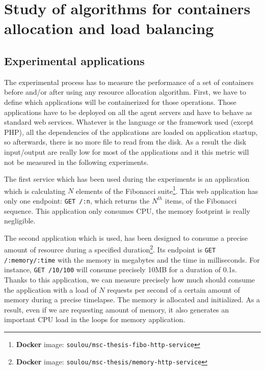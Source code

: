 \chapter{Study of algorithms for containers allocation and load balancing}
\label{chapt:containerloadbalance}

\section{Experimental applications}

The experimental process has to measure the performance of a set of containers
before and/or after using any resource allocation algorithm. First, we have to
define which applications will be containerized for those operations. Those
applications have to be deployed on all the agent servers and have to behave as
standard web services. Whatever is the language or the framework used (except
PHP), all the dependencies of the applications are loaded on application
startup, so afterwards, there is no more file to read from the disk.  As a
result the disk input/output are really low for most of the applications and it
this metric will not be measured in the following experiments.

The first service which has been used during the experiments is an application which
is calculating $N$ elements of the Fibonacci suite\footnote{\textbf{Docker}
image: \texttt{soulou/msc-thesis-fibo-http-service}}. This web application has
only one endpoint: \texttt{GET /:n}, which returns the $N^{th}$ items, of the
Fibonacci sequence. This application only consumes CPU, the memory footprint is
really negligible.

The second application which is used, has been designed to consume a precise
amount of resource during a specified duration\footnote{\textbf{Docker} image:
\texttt{soulou/msc-thesis/memory-http-service}}. Its endpoint is \texttt{GET
/:memory/:time} with the memory in megabytes and the time in milliseconds. For
instance, \texttt{GET /10/100} will consume precisely 10MB for a duration of
0.1s. Thanks to this application, we can measure precisely how much should
consume the application with a load of $N$ requests per second of a certain
amount of memory during a precise timelapse.
The memory is allocated and initialized. As a result, even if we are requesting
amount of memory, it also generates an important CPU load in the loops for memory
application.

